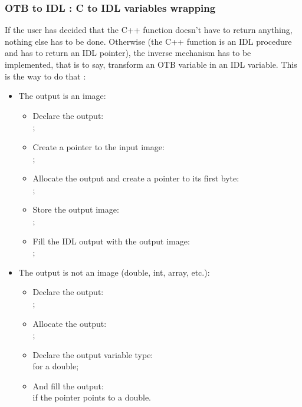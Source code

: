\subsubsection{OTB to IDL : C to IDL variables wrapping}
If the user has decided that the C++ function doesn't have to return anything, nothing else has to be done. Otherwise (the C++ function is an IDL procedure and  has to return an IDL pointer), the inverse mechanism has to be implemented, that is to say, transform an OTB variable in an IDL variable. This is the way to do that :
\begin{itemize}
  \item The output is an image:
    \begin{itemize}
    \item Declare the output:\\ ;
    \item Create a pointer to the input image:\\ ;
    \item Allocate the output and create a pointer to its first byte:\\ ;
    \item Store the output image:\\ ;
    \item Fill the IDL output with the output image:\\ ;
    \end{itemize}
  \item The output is not an image (double, int, array, etc.):
    \begin{itemize}
    \item Declare the output:\\ ;
    \item Allocate the output:\\ ;
    \item Declare the output variable type:\\  for a double;
    \item And fill the output:\\  if the pointer points to a double.
    \end{itemize}
\end{itemize}


